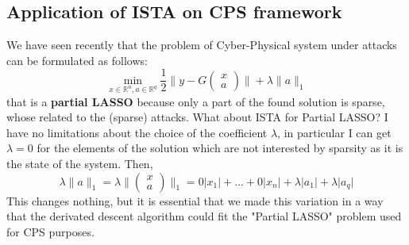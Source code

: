 \subsection{Application of ISTA on CPS framework} 
We have seen recently that the problem of Cyber-Physical system under attacks can be formulated as follows: 
\begin{equation}
    \min_{x \in \mathbb{R}^n, a \in \mathbb{R}^q} 
    {\frac{1}{2} \bigg\lVert y-G \begin{pmatrix}
        x\\a
    \end{pmatrix} \bigg\rVert + \lambda \lVert a \rVert_1}
\end{equation}
that is a \textbf{partial LASSO} because only a part of the found solution is sparse, whose related to the (sparse) attacks. What about ISTA for Partial LASSO?
I have no limitations about the choice of the coefficient $\lambda$, in particular I can get $\lambda=0$ for the elements of the solution which are not interested by sparsity as it is the state of the system. Then, 
\begin{equation}
    \lambda\lVert a \rVert_1 = \lambda\bigg\lVert \begin{pmatrix}
        x\\a
    \end{pmatrix} \bigg\rVert_1 = 0\lvert x_1 \rvert+...+0\lvert x_n \rvert+
    \lambda \lvert a_1 \rvert + \lambda \lvert a_q \rvert
\end{equation}
This changes nothing, but it is essential that we made this variation in a way that the derivated descent algorithm could fit the "Partial LASSO" problem used for CPS purposes.

